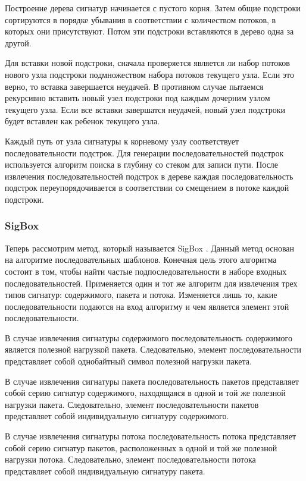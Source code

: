 Построение дерева сигнатур начинается с пустого корня.
Затем общие подстроки сортируются в порядке убывания в соответствии с количеством потоков, в которых они присутствуют.
Потом эти подстроки вставляются в дерево одна за другой.

Для вставки новой подстроки, сначала проверяется является ли набор потоков нового узла подстроки
подмножеством набора потоков текущего узла. Если это верно, то вставка завершается неудачей.
В противном случае пытаемся рекурсивно вставить новый узел подстроки под каждым дочерним узлом текущего узла.
Если все вставки завершатся неудачей, новый узел подстроки будет вставлен как ребенок текущего узла.

Каждый путь от узла сигнатуры к корневому узлу соответствует последовательности подстрок.
Для генерации последовательностей подстрок используется алгоритм поиска в глубину со стеком для записи пути.
После извлечения последовательностей подстрок в дереве каждая последовательность подстрок
переупорядочивается в соответствии со смещением в потоке каждой подстроки.

\subsubsection{SigBox}

Теперь рассмотрим метод, который называется SigBox \cite{shim2017sigbox}. Данный метод основан на алгоритме последовательных шаблонов.
Конечная цель этого алгоритма состоит в том, чтобы найти частые подпоследовательности в наборе входных последовательностей.
Применяется один и тот же алгоритм для извлечения трех типов сигнатур: содержимого, пакета и потока. Изменяется лишь то, какие последовательности
подаются на вход алгоритму и чем является элемент этой последовательности.

В случае извлечения сигнатуры содержимого последовательность содержимого является полезной нагрузкой пакета.
Следовательно, элемент последовательности представляет собой однобайтный символ полезной нагрузки пакета.

В случае извлечения сигнатуры пакета последовательность пакетов представляет собой серию сигнатур содержимого, находящаяся в одной и той же полезной нагрузки пакета.
Следовательно, элемент последовательности пакетов представляет собой индивидуальную сигнатуру содержимого.

В случае извлечения сигнатуры потока последовательность потока представляет собой серию сигнатур пакетов, расположенных в одной и той же полезной нагрузки потока.
Следовательно, элемент последовательности потока представляет собой индивидуальную сигнатуру пакета.

